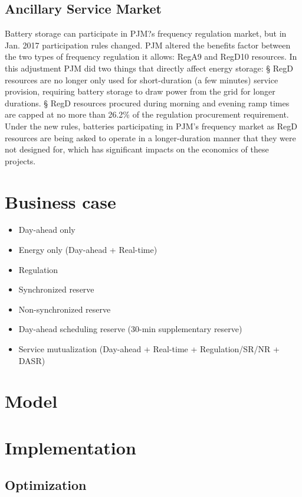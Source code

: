 \subsection{Ancillary Service Market}
Battery storage can participate in PJM?s frequency regulation market, but in Jan. 2017 participation rules changed. PJM altered the benefits factor between the two types of frequency regulation it allows: RegA9 and RegD10 resources. In this adjustment PJM did two things that directly affect energy storage:
§ RegD resources are no longer only used for short-duration (a few minutes) service provision, requiring battery storage to draw power from the grid for longer durations.
§ RegD resources procured during morning and evening ramp times are capped at no more than 26.2\% of the regulation procurement requirement.
Under the new rules, batteries participating in PJM's frequency market as RegD resources are being asked to operate in a longer-duration manner that they were not designed for, which has significant impacts on the economics of these projects. 
%
\section{Business case}

\begin{itemize}
	\item Day-ahead only
	\item Energy only (Day-ahead + Real-time)
	\item Regulation
	\item Synchronized reserve
	\item Non-synchronized reserve
	\item Day-ahead scheduling reserve (30-min supplementary reserve)
	\item Service mutualization (Day-ahead + Real-time + Regulation/SR/NR + DASR)
\end{itemize}

\section{Model}

\section{Implementation}

\subsection{Optimization}

